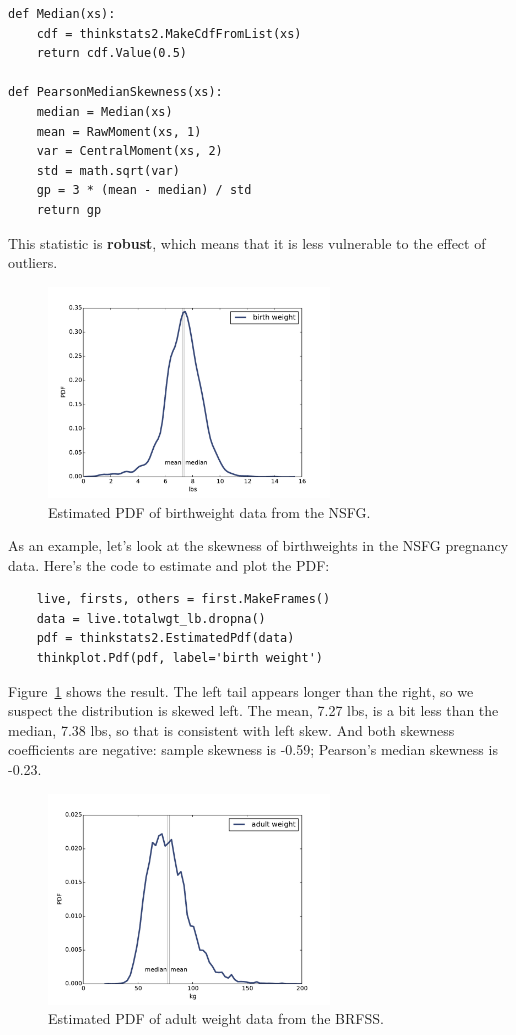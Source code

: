 \documentclass[12pt]{book}
\begin{document}
\begin{verbatim}
def Median(xs):
    cdf = thinkstats2.MakeCdfFromList(xs)
    return cdf.Value(0.5)

def PearsonMedianSkewness(xs):
    median = Median(xs)
    mean = RawMoment(xs, 1)
    var = CentralMoment(xs, 2)
    std = math.sqrt(var)
    gp = 3 * (mean - median) / std
    return gp
\end{verbatim}

This statistic is {\bf robust}, which means that it is less vulnerable
to the effect of outliers.

\begin{figure}
\centerline{\includegraphics[height=2.2in]{figs/density_totalwgt_kde.pdf}}
\caption{Estimated PDF of birthweight data from the NSFG.}
\label{density_totalwgt_kde}
\end{figure}

As an example, let's look at the skewness of birthweights in the
NSFG pregnancy data.  Here's the code to estimate and plot the PDF:

\begin{verbatim}
    live, firsts, others = first.MakeFrames()
    data = live.totalwgt_lb.dropna()
    pdf = thinkstats2.EstimatedPdf(data)
    thinkplot.Pdf(pdf, label='birth weight')
\end{verbatim}

Figure~\ref{density_totalwgt_kde} shows the result.  The left tail appears
longer than the right, so we suspect the distribution is skewed left.
The mean, 7.27 lbs, is a bit less than
the median, 7.38 lbs, so that is consistent with left skew.
And both skewness coefficients are negative:
sample skewness is -0.59;
Pearson's median skewness is -0.23.

\begin{figure}
\centerline{\includegraphics[height=2.2in]{figs/density_wtkg2_kde.pdf}}
\caption{Estimated PDF of adult weight data from the BRFSS.}
\label{density_wtkg2_kde}
\end{figure}
\end{document}

